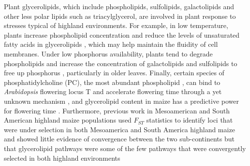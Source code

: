 \documentclass[9pt,twocolumn,twoside,lineno]{BioRxiv}
\begin{document}
Plant glycerolipids, which include phospholipids, sulfolipids, galactolipids and other less polar lipids such as triacylglycerol, are involved in plant response to stresses typical of highland environments.
For example, in low temperature, plants increase phospholipid concentration \cite{Degenkolbe2012-wf} and reduce the levels of unsaturated fatty acids in glycerolipids \cite{Welti2002-uk, Lynch1987-ln}, which may help maintain the fluidity of cell membranes.
Under low phosphorus availability, plants tend to degrade phospholipids and increase the concentration of galactolipids and sulfolipids to free up phosphorus \cite{Lambers2012-an}, particularly in older leaves. 
Finally, certain species of phosphatidylcholine (PC), the most abundant phospholipid \cite{Gu2017-nd, Poincelot1976-qe, Hawke1974-ab}, can bind to \textit{Arabidopsis} flowering locus T and accelerate flowering time through a yet unknown mechanism \cite{Nakamura2014-qf}, and  glycerolipid content in maize has a  predictive power for flowering time \cite{Riedelsheimer2013-bd}. 
Furthermore, previous work in Mesoamerican and South American highland maize populations used $F_{ST}$ statistics to identify loci that were under selection in both Mesoamerica and South America highland maize and showed little evidence of convergence between the two sub-continents but that glycerolipid pathways were some of the few pathways that were convergently selected in both highland environments  \cite{Takuno2015-uj}
\end{document}
